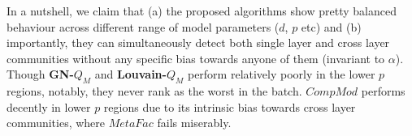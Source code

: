 






In a nutshell, we claim that (a) the proposed algorithms show pretty balanced behaviour across different range of model
parameters ($d$, $p$ etc) and (b) importantly, they can
simultaneously detect both single layer and cross layer communities without any specific bias towards anyone of 
them (invariant to $\alpha$).
Though \textbf{GN-$Q_M$} and \textbf{Louvain-$Q_M$} perform relatively poorly in the lower $p$ regions, notably, they never rank as the
worst in the batch. $CompMod$ performs decently in lower $p$ regions due to its intrinsic bias towards cross layer communities,
where $MetaFac$ fails miserably.

